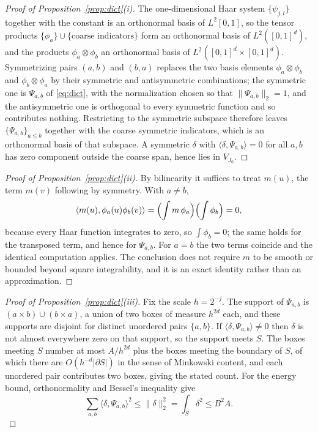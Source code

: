 \documentclass[11pt]{article}
\theoremstyle{definition}
\newcommand{\1}{\mathbf 1}\newcommand{\op}{\operatorname}
\begin{document}
\begin{proof}[Proof of Proposition~\ref{prop:dict}(i)]
The one-dimensional Haar system $\{\psi_{j,l}\}$ together with the constant is
an orthonormal basis of $L^2[0,1]$, so the tensor products
$\{\phi_a\}\cup\{\text{coarse indicators}\}$ form an orthonormal basis of
$L^2([0,1]^d)$, and the products $\phi_a\otimes\phi_b$ an orthonormal basis of
$L^2([0,1]^d\times[0,1]^d)$.  Symmetrizing pairs $(a,b)$ and $(b,a)$ replaces
the two basis elements $\phi_a\otimes\phi_b$ and $\phi_b\otimes\phi_a$ by their
symmetric and antisymmetric combinations; the symmetric one is $\Psi_{a,b}$ of
\eqref{eq:dict}, with the normalization chosen so that
$\|\Psi_{a,b}\|_2=1$, and the antisymmetric one is orthogonal to every
symmetric function and so contributes nothing.  Restricting to the symmetric
subspace therefore leaves $\{\Psi_{a,b}\}_{a\le b}$ together with the coarse
symmetric indicators, which is an orthonormal basis of that subspace.  A
symmetric $\delta$ with $\langle\delta,\Psi_{a,b}\rangle=0$ for all $a,b$ has
zero component outside the coarse span, hence lies in $V_{J_0}$.
\end{proof}

\begin{proof}[Proof of Proposition~\ref{prop:dict}(ii)]
By bilinearity it suffices to treat $m(u)$, the term $m(v)$ following by
symmetry.  With $a\ne b$,
\[
\langle m(u),\phi_a(u)\phi_b(v)\rangle
=\Bigl(\int m\,\phi_a\Bigr)\Bigl(\int \phi_b\Bigr)=0,
\]
because every Haar function integrates to zero, so $\int\phi_b=0$; the same
holds for the transposed term, and hence for $\Psi_{a,b}$.  For $a=b$ the two
terms coincide and the identical computation applies.  The conclusion does not
require $m$ to be smooth or bounded beyond square integrability, and it is an
exact identity rather than an approximation.
\end{proof}

\begin{proof}[Proof of Proposition~\ref{prop:dict}(iii)]
Fix the scale $h=2^{-j}$.  The support of $\Psi_{a,b}$ is
$(a\times b)\cup(b\times a)$, a union of two boxes of measure $h^{2d}$ each, and
these supports are disjoint for distinct unordered pairs $\{a,b\}$.  If
$\langle\delta,\Psi_{a,b}\rangle\ne0$ then $\delta$ is not almost everywhere
zero on that support, so the support meets $S$.  The boxes meeting $S$ number
at most $A/h^{2d}$ plus the boxes meeting the boundary of $S$, of which there
are $O(h^{-d}|\partial S|)$ in the sense of Minkowski content, and each
unordered pair contributes two boxes, giving the stated count.  For the energy
bound, orthonormality and Bessel's inequality give
\[
\sum_{a,b}\langle\delta,\Psi_{a,b}\rangle^2\le\|\delta\|_2^2
=\int_{S}\delta^2\le B^2A .
\]
\end{proof}
\end{document}
